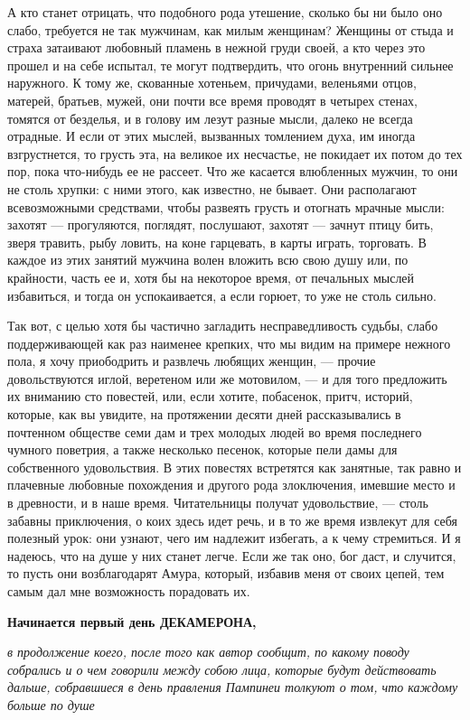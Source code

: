 А кто станет отрицать, что подобного рода утешение, сколько бы ни было оно слабо, требуется не так мужчинам, как милым женщинам? Женщины от стыда и страха затаивают любовный пламень в нежной груди своей, а кто через это прошел и на себе испытал, те могут подтвердить, что огонь внутренний сильнее наружного. К тому же, скованные хотеньем, причудами, веленьями отцов, матерей, братьев, мужей, они почти все время проводят в четырех стенах, томятся от безделья, и в голову им лезут разные мысли, далеко не всегда отрадные. И если от этих мыслей, вызванных томлением духа, им иногда взгрустнется, то грусть эта, на великое их несчастье, не покидает их потом до тех пор, пока что-нибудь ее не рассеет. Что же касается влюбленных мужчин, то они не столь хрупки: с ними этого, как известно, не бывает. Они располагают всевозможными средствами, чтобы развеять грусть и отогнать мрачные мысли: захотят --- прогуляются, поглядят, послушают, захотят --- зачнут птицу бить, зверя травить, рыбу ловить, на коне гарцевать, в карты играть, торговать. В каждое из этих занятий мужчина волен вложить всю свою душу или, по крайности, часть ее и, хотя бы на некоторое время, от печальных мыслей избавиться, и тогда он успокаивается, а если горюет, то уже не столь сильно.


Так вот, с целью хотя бы частично загладить несправедливость судьбы, слабо поддерживающей как раз наименее крепких, что мы видим на примере нежного пола, я хочу приободрить и развлечь любящих женщин, --- прочие довольствуются иглой, веретеном или же мотовилом, --- и для того предложить их вниманию сто повестей, или, если хотите, побасенок, притч, историй, которые, как вы увидите, на протяжении десяти дней рассказывались в почтенном обществе семи дам и трех молодых людей во время последнего чумного поветрия, а также несколько песенок, которые пели дамы для собственного удовольствия. В этих повестях встретятся как занятные, так равно и плачевные любовные похождения и другого рода злоключения, имевшие место и в древности, и в наше время. Читательницы получат удовольствие, --- столь забавны приключения, о коих здесь идет речь, и в то же время извлекут для себя полезный урок: они узнают, чего им надлежит избегать, а к чему стремиться. И я надеюсь, что на душе у них станет легче. Если же так оно, бог даст, и случится, то пусть они возблагодарят Амура, который, избавив меня от своих цепей, тем самым дал мне возможность порадовать их.


\textbf{Начинается первый день ДЕКАМЕРОНА,}

\emph{в продолжение коего, после того как автор сообщит, по какому поводу собрались и о чем говорили между собою лица, которые будут действовать дальше, собравшиеся в день правления Пампинеи толкуют о том, что каждому больше по душе}

